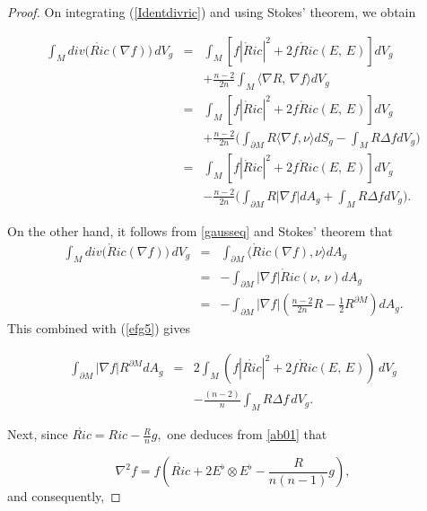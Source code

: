 \documentclass{amsart}
\numberwithin{equation}{section}
\begin{document}
	
	\begin{proof}
	On integrating (\ref{Identdivric}) and using Stokes' theorem, we obtain 
	
	
			\begin{eqnarray}
			\label{efg5}
			\int_{M} div\big(\mathring{Ric}(\nabla f)\big)\,dV_{g}&=&\int_{M}\left[f|\mathring{R}ic|^{2}+2f\mathring{R}ic(E,\,E)\right]dV_{g}\nonumber\\
			&&+\frac{n-2}{2n}\int_{M}\langle \nabla R,\,\nabla f\rangle dV_{g}\nonumber\\&=& \int_{M}\left[f|\mathring{R}ic|^{2}+2f\mathring{R}ic(E,\,E)\right]dV_{g}\nonumber\\
			&&+\frac{n-2}{2n}\Big(\int_{\partial M}R\langle \nabla f,\nu\rangle dS_{g}-\int_{M}R\Delta f dV_{g}\Big)\nonumber\\&=& \int_{M}\left[f|\mathring{R}ic|^{2}+2f\mathring{R}ic(E,\,E)\right]dV_{g}\nonumber\\
			&&-\frac{n-2}{2n}\Big(\int_{\partial M}R|\nabla f| dA_{g}+\int_{M}R\Delta f dV_{g}\Big).
		\end{eqnarray} 
		
		
		
		On the other hand, it follows from \eqref{gausseq} and Stokes' theorem that
		\begin{eqnarray}
			\label{4eq2}
			\int_{M} div\big(\mathring{R}ic(\nabla f)\big)\,dV_{g}&=&\int_{\partial M}\langle \mathring{R}ic(\nabla f),\nu\rangle dA_{g}\nonumber\\&=&-\int_{\partial M}|\nabla f|\mathring{R}ic(\nu,\,\nu) dA_{g}\nonumber\\&=& -\int_{\partial M}|\nabla f|\left(\frac{n-2}{2n}R -\frac{1}{2}R^{\partial M}\right) dA_{g}.
		\end{eqnarray} This combined with (\ref{efg5}) gives
	
		
	
		\begin{eqnarray}\label{eqmassa}
			\int_{\partial M}\vert\nabla f\vert R^{\partial M} dA_{g}&=& 2\int_{M}\left(f|\mathring{Ric}|^{2}+2f\mathring{R}ic(E,\,E)\right)\,dV_{g}\nonumber\\
			&& -\frac{(n-2)}{n}\int_{M}R\Delta f \,dV_{g}.
		\end{eqnarray}
		
		
		
		Next, since $\mathring{Ric}=Ric-\frac{R}{n}g,$ one deduces from \eqref{ab01} that
		
		$$\nabla^2 f = f\left(\mathring{Ric}+2 E^{\flat}\otimes E^{\flat} -\frac{R}{n(n-1)}g\right),$$ and consequently, 
		

\end{proof}
\end{document}
